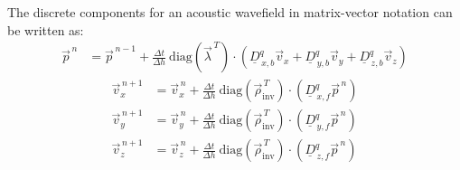 \documentclass[pdftex,a4paper,parskip,listof=totoc,bibliography=totoc,onehalfspacing,12pt]{scrreprt}
\begin{document}
The discrete components for an acoustic wavefield in matrix-vector notation can be written as:
\begin{align*}
	\vec{p}^{\,n} &= \vec{p}^{\,n-1} + \frac{\Delta t}{\Delta h}~ \mathrm{diag} \left( \vec{\lambda}^{\,T} \right) \cdot \left( \underline{D}_{\,x,b}^q \vec{v}_x +\underline{D}_{\,y,b}^q \vec{v}_y + \underline{D}_{\,z,b}^q \vec{v}_z \right) 
\end{align*}
\begin{align*}
	\vec{v}_x^{\,n+1} &= \vec{v}_x^{\,n} + \frac{\Delta t}{\Delta h} ~ \mathrm{diag} \left( \vec{\rho}_\mathrm{inv}^{\,T} \right) \cdot \left( \underline{D}_{\,x,f}^q \vec{p}^{\,n}  \right)\\
	\vec{v}_y^{\,n+1} &= \vec{v}_y^{\,n} + \frac{\Delta t}{\Delta h} ~ \mathrm{diag} \left( \vec{\rho}_\mathrm{inv}^{\,T} \right) \cdot \left( \underline{D}_{\,y,f}^q \vec{p}^{\,n} \right)\\
	\vec{v}_z^{\,n+1} &= \vec{v}_z^{\,n} + \frac{\Delta t}{\Delta h} ~ \mathrm{diag}  \left( \vec{\rho}_\mathrm{inv}^{\,T} \right) \cdot\left( \underline{D}_{\,z,f}^q \vec{p}^{\,n} \right)\\
\end{align*}
\end{document}
